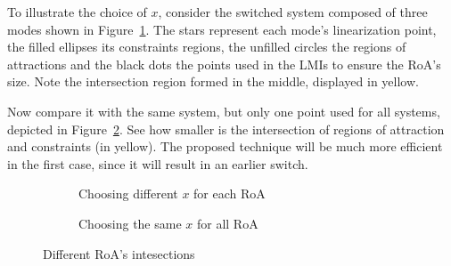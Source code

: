 To illustrate the choice of \(x\), consider the switched system composed of
three modes shown in Figure~\ref{fig:choice-x-roa-diff}. The stars represent
each mode's linearization point, the filled ellipses its constraints regions,
the unfilled circles the regions of attractions and the black dots the points
used in the LMIs to ensure the RoA's size. Note the intersection region formed
in the middle, displayed in yellow.

Now compare it with the same system, but only one point used for all systems,
depicted in Figure~\ref{fig:choice-x-roa-same}. See how smaller is the
intersection of regions of attraction and constraints (in yellow). The proposed
technique will be much more efficient in the first case, since it will result in
an earlier switch.

\begin{figure}[!htb]
  \centering
  \begin{subfigure}[b]{.45\linewidth}
    \centering
    
    \caption{Choosing different \(x\) for each RoA}%
    \label{fig:choice-x-roa-diff}
  \end{subfigure}
  \begin{subfigure}[b]{.45\linewidth}
    \centering
    
    \caption{Choosing the same \(x\) for all RoA}%
    \label{fig:choice-x-roa-same}
  \end{subfigure}
  \caption{Different RoA's intesections}%
  \label{fig:choices-of-x}
\end{figure}

